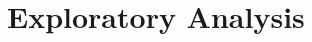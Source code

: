 \documentclass[11pt,a4paper]{article}
\begin{document}
\newpage







\newpage

\section{Exploratory Analysis}
\end{document}
